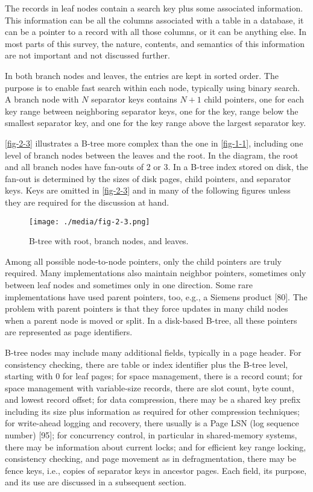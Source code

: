 The records in leaf nodes contain a search key plus some associated
information. This information can be all the columns associated with a
table in a database, it can be a pointer to a record with all those
columns, or it can be anything else. In most parts of this survey, the
nature, contents, and semantics of this information are not important
and not discussed further.

In both branch nodes and leaves, the entries are kept in sorted order.
The purpose is to enable fast search within each node, typically using
binary search. A branch node with $N$ separator keys contains
$N + 1$ child pointers, one for each key range between neighboring
separator keys, one for the key, range below the smallest separator key,
and one for the key range above the largest separator key.

\autoref{fig-2-3} illustrates a B-tree more complex than the one in \autoref{fig-1-1},
including one level of branch nodes between the leaves and the root. In
the diagram, the root and all branch nodes have fan-outs of 2 or 3. In a
B-tree index stored on disk, the fan-out is determined by the sizes of
disk pages, child pointers, and separator keys. Keys are omitted in
\autoref{fig-2-3} and in many of the following figures unless they are required
for the discussion at hand.

\begin{figure}
  \centering
  \texttt{[image: ./media/fig-2-3.png]}

  \caption{B-tree with root, branch nodes, and leaves.\label{fig-2-3}}
\end{figure}

Among all possible node-to-node pointers, only the child pointers are
truly required. Many implementations also maintain neighbor pointers,
sometimes only between leaf nodes and sometimes only in one direction.
Some rare implementations have used parent pointers, too, e.g., a
Siemens product {[}80{]}. The problem with parent pointers is that they
force updates in many child nodes when a parent node is moved or split.
In a disk-based B-tree, all these pointers are represented as page
identifiers.

B-tree nodes may include many additional fields, typically in a page
header. For consistency checking, there are table or index identifier
plus the B-tree level, starting with 0 for leaf pages; for space
management, there is a record count; for space management with
variable-size records, there are slot count, byte count, and lowest
record offset; for data compression, there may be a shared key prefix
including its size plus information as required for other compression
techniques; for write-ahead logging and recovery, there usually is a
Page LSN (log sequence number) {[}95{]}; for concurrency control, in
particular in shared-memory systems, there may be information about
current locks; and for efficient key range locking, consistency
checking, and page movement as in defragmentation, there may be fence
keys, i.e., copies of separator keys in ancestor pages. Each field, its
purpose, and its use are discussed in a subsequent section.

